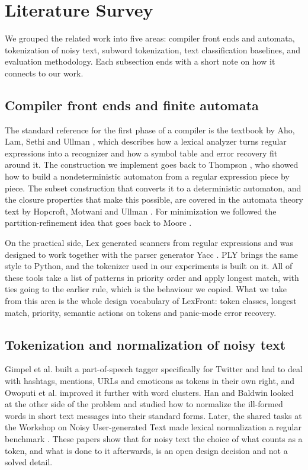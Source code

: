 \documentclass[journal,onecolumn,12pt,a4paper]{IEEEtran}
\begin{document}
\section{Literature Survey}\label{sec:2}
We grouped the related work into five areas: compiler front ends and automata, tokenization of noisy text, subword tokenization, text classification baselines, and evaluation methodology. Each subsection ends with a short note on how it connects to our work.

\subsection{Compiler front ends and finite automata}\label{sec:2.1}
The standard reference for the first phase of a compiler is the textbook by Aho, Lam, Sethi and Ullman \cite{r1}, which describes how a lexical analyzer turns regular expressions into a recognizer and how a symbol table and error recovery fit around it. The construction we implement goes back to Thompson \cite{r5}, who showed how to build a nondeterministic automaton from a regular expression piece by piece. The subset construction that converts it to a deterministic automaton, and the closure properties that make this possible, are covered in the automata theory text by Hopcroft, Motwani and Ullman \cite{r6}. For minimization we followed the partition-refinement idea that goes back to Moore \cite{r7}.

On the practical side, Lex \cite{r8} generated scanners from regular expressions and was designed to work together with the parser generator Yacc \cite{r9}. PLY \cite{r10} brings the same style to Python, and the tokenizer used in our experiments is built on it. All of these tools take a list of patterns in priority order and apply longest match, with ties going to the earlier rule, which is the behaviour we copied. What we take from this area is the whole design vocabulary of LexFront: token classes, longest match, priority, semantic actions on tokens and panic-mode error recovery.

\subsection{Tokenization and normalization of noisy text}\label{sec:2.2}
Gimpel et al. \cite{r2} built a part-of-speech tagger specifically for Twitter and had to deal with hashtags, mentions, URLs and emoticons as tokens in their own right, and Owoputi et al. \cite{r11} improved it further with word clusters. Han and Baldwin \cite{r3} looked at the other side of the problem and studied how to normalize the ill-formed words in short text messages into their standard forms. Later, the shared tasks at the Workshop on Noisy User-generated Text made lexical normalization a regular benchmark \cite{r12}. These papers show that for noisy text the choice of what counts as a token, and what is done to it afterwards, is an open design decision and not a solved detail.
\end{document}
